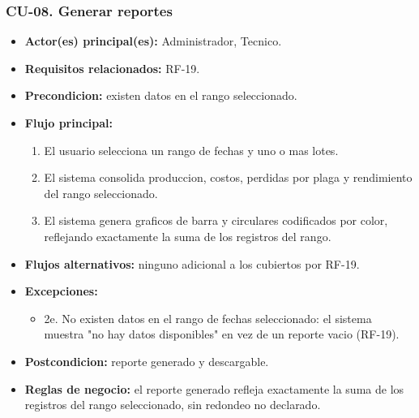 \documentclass[11pt,a4paper]{article}
\begin{document}
\subsubsection{CU-08. Generar reportes}
\begin{itemize}
\item \textbf{Actor(es) principal(es):} Administrador, Tecnico.
\item \textbf{Requisitos relacionados:} RF-19.
\item \textbf{Precondicion:} existen datos en el rango seleccionado.
\item \textbf{Flujo principal:}
  \begin{enumerate}
  \item El usuario selecciona un rango de fechas y uno o mas lotes.
  \item El sistema consolida produccion, costos, perdidas por plaga y rendimiento del rango seleccionado.
  \item El sistema genera graficos de barra y circulares codificados por color, reflejando exactamente la suma de los registros del rango.
  \end{enumerate}
\item \textbf{Flujos alternativos:} ninguno adicional a los cubiertos por RF-19.
\item \textbf{Excepciones:}
  \begin{itemize}
  \item 2e. No existen datos en el rango de fechas seleccionado: el sistema muestra "no hay datos disponibles" en vez de un reporte vacio (RF-19).
  \end{itemize}
\item \textbf{Postcondicion:} reporte generado y descargable.
\item \textbf{Reglas de negocio:} el reporte generado refleja exactamente la suma de los registros del rango seleccionado, sin redondeo no declarado.
\end{itemize}
\end{document}
